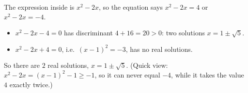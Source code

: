 The expression inside is $x^2-2x$, so the equation says $x^2-2x=4$ or $x^2-2x=-4$.
\begin{itemize}
\item $x^2-2x-4=0$ has discriminant $4+16=20>0$: two solutions $x=1\pm\sqrt5$.
\item $x^2-2x+4=0$, i.e.\ $(x-1)^2=-3$, has no real solutions.
\end{itemize}
So there are $\boxed{2}$ real solutions, $x=1\pm\sqrt5$. (Quick view: $x^2-2x=(x-1)^2-1\ge-1$, so it can never equal $-4$, while it takes the value $4$ exactly twice.)
